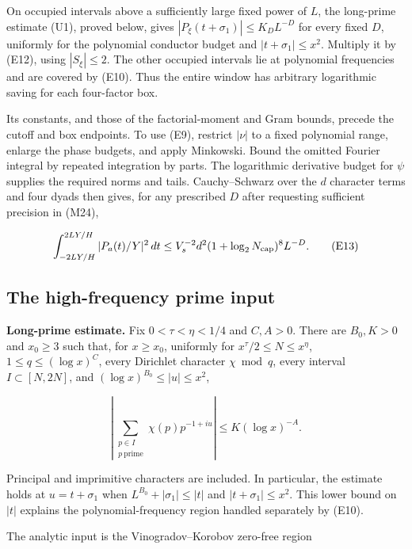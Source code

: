 On occupied intervals above a sufficiently large fixed power of \(L\),
the long-prime estimate (U1), proved below, gives
\(|P_\xi(t+\sigma_1)|\le K_D L^{-D}\) for every fixed \(D\), uniformly
for the polynomial conductor budget and \(|t+\sigma_1|\le x^2\).
Multiply it by (E12), using \(|S_\xi|\le2\). The other occupied
intervals lie at polynomial frequencies and are covered by (E10). Thus
the entire window has arbitrary logarithmic saving for each four-factor
box.

Its constants, and those of the factorial-moment and Gram bounds,
precede the cutoff and box endpoints. To use (E9), restrict \(|\nu|\) to
a fixed polynomial range, enlarge the phase budgets, and apply
Minkowski. Bound the omitted Fourier integral by repeated integration by
parts. The logarithmic derivative budget for \(\psi\) supplies the
required norms and tails. Cauchy--Schwarz over the \(d\) character terms
and four dyads then gives, for any prescribed \(D\) after requesting
sufficient precision in (M24),

\[
\int_{-2LY/H}^{2LY/H}|P_a(t)/Y|^2\,dt
 \le V_s^{-2}d^2(1+\log_2N_{\rm cap})^8 L^{-D}.
\tag{E13}
\]


\hypertarget{local-energy-the-high-frequency-prime-input}{%
\subsection{The high-frequency prime
input}\label{local-energy-the-high-frequency-prime-input}}

\textbf{Long-prime estimate.} Fix \(0<\tau<\eta<1/4\) and \(C,A>0\).
There are \(B_0,K>0\) and \(x_0\ge3\) such that, for \(x\ge x_0\),
uniformly for \(x^\tau/2\le N\le x^\eta\), \(1\le q\le(\log x)^C\),
every Dirichlet character \(\chi\bmod q\), every interval
\(I\subset[N,2N]\), and \((\log x)^{B_0}\le|u|\le x^2\),

\[
\left|\sum_{\substack{p\in I\\p\ \mathrm{prime}}}
       \chi(p)p^{-1+iu}\right|\le K(\log x)^{-A}.
\tag{U1}
\]

Principal and imprimitive characters are included. In particular, the
estimate holds at \(u=t+\sigma_1\) when \(L^{B_0}+|\sigma_1|\le|t|\) and
\(|t+\sigma_1|\le x^2\). This lower bound on \(|t|\) explains the
polynomial-frequency region handled separately by (E10).

The analytic input is the Vinogradov--Korobov zero-free region

